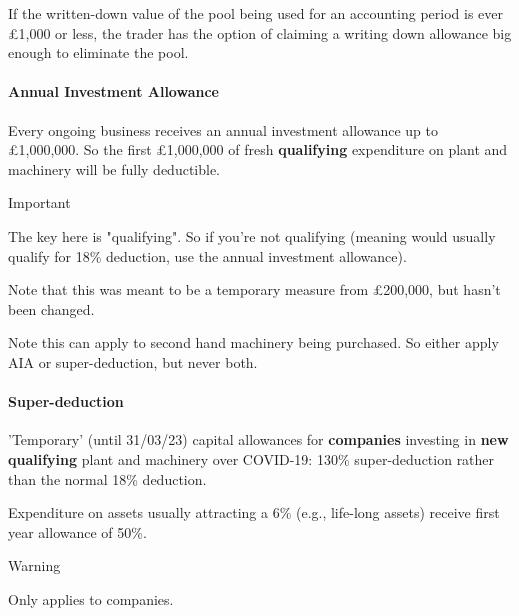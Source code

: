 \documentclass[
]{article}
\newenvironment{env-cb77b424-888b-4192-8bb4-4a31d57bbcb7}
{
    \savenotes\tcolorbox[blanker,breakable,left=5pt,borderline west={2pt}{-4pt}{orange}]
}
{
    \endtcolorbox\spewnotes
}
\newenvironment{env-b61b3e6f-3f12-4601-9a57-a38348b0a5b7}
{
    \savenotes\tcolorbox[blanker,breakable,left=5pt,borderline west={2pt}{-4pt}{cyan}]
}
{
    \endtcolorbox\spewnotes
}
\begin{document}
If the written-down value of the pool being used for an accounting
period is ever £1,000 or less, the trader has the option of claiming a
writing down allowance big enough to eliminate the pool.

\hypertarget{annual-investment-allowance}{%
\paragraph{Annual Investment
Allowance}\label{annual-investment-allowance}}

Every ongoing business receives an annual investment allowance up to
£1,000,000. So the first £1,000,000 of fresh \textbf{qualifying}
expenditure on plant and machinery will be fully deductible.

\begin{env-b61b3e6f-3f12-4601-9a57-a38348b0a5b7}

Important

The key here is "qualifying". So if you're not qualifying (meaning would
usually qualify for 18\% deduction, use the annual investment
allowance).

\end{env-b61b3e6f-3f12-4601-9a57-a38348b0a5b7}

Note that this was meant to be a temporary measure from £200,000, but
hasn't been changed.

Note this can apply to second hand machinery being purchased. So either
apply AIA or super-deduction, but never both.

\hypertarget{super-deduction}{%
\paragraph{Super-deduction}\label{super-deduction}}

'Temporary' (until 31/03/23) capital allowances for \textbf{companies}
investing in \textbf{new} \textbf{qualifying} plant and machinery over
COVID-19: 130\% super-deduction rather than the normal 18\% deduction.

Expenditure on assets usually attracting a 6\% (e.g., life-long assets)
receive first year allowance of 50\%.

\begin{env-cb77b424-888b-4192-8bb4-4a31d57bbcb7}

Warning

Only applies to companies.

\end{env-cb77b424-888b-4192-8bb4-4a31d57bbcb7}
\end{document}
